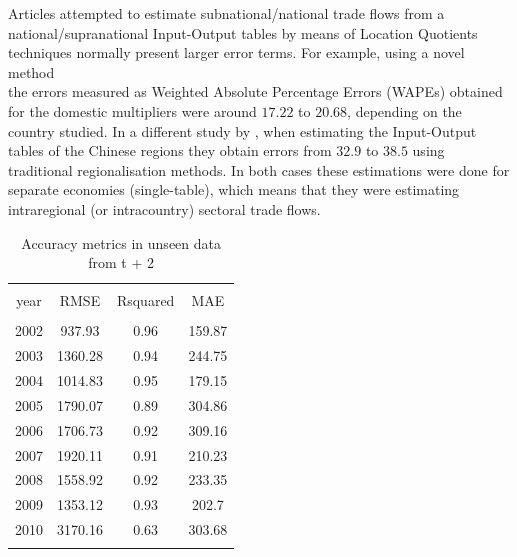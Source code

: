 \documentclass[]{interact}
\theoremstyle{plain}%
\theoremstyle{definition}
\theoremstyle{remark}
\begin{document}
Articles attempted to estimate subnational/national trade flows from a
national/supranational Input-Output tables by means of Location
Quotients techniques normally present larger error terms. For example,
\citet{pereira2020bidimensional} using a novel method\\
the errors measured as Weighted Absolute Percentage Errors (WAPEs)
obtained for the domestic multipliers were around \(17.22\) to
\(20.68\), depending on the country studied. In a different study by
\citet{jiang2012improved}, when estimating the Input-Output tables of
the Chinese regions they obtain errors from \(32.9\) to \(38.5\) using
traditional regionalisation methods. In both cases these estimations
were done for separate economies (single-table), which means that they
were estimating intraregional (or intracountry) sectoral trade flows.

\begin{table}[!htbp] \centering 
  \caption{Accuracy metrics in unseen data from t + 2\label{accuracy_test}} 
  \label{} 
\footnotesize 
\begin{tabular}{@{\extracolsep{0pt}} cccc} 
\\[-1.8ex]\hline 
\hline \\[-1.8ex] 
year & RMSE & Rsquared & MAE \\ 
\hline \\[-1.8ex] 
2002 & 937.93 & 0.96 & 159.87 \\ 
2003 & 1360.28 & 0.94 & 244.75 \\ 
2004 & 1014.83 & 0.95 & 179.15 \\ 
2005 & 1790.07 & 0.89 & 304.86 \\ 
2006 & 1706.73 & 0.92 & 309.16 \\ 
2007 & 1920.11 & 0.91 & 210.23 \\ 
2008 & 1558.92 & 0.92 & 233.35 \\ 
2009 & 1353.12 & 0.93 & 202.7 \\ 
2010 & 3170.16 & 0.63 & 303.68 \\ 
\hline \\[-1.8ex] 
\end{tabular} 
\end{table}
\end{document}
